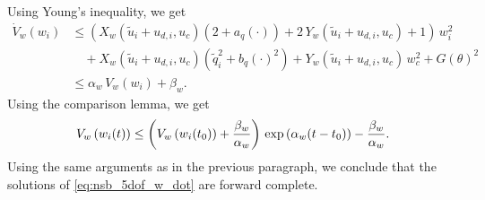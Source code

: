 Using Young's inequality, we get
\begin{equation}
    \begin{split}
        \dot{V}_w(w_i) &\leq \left(X_w\left(\tilde{u}_i + u_{d,i}, u_c\right)\left(2 + a_q(\cdot)\right) + 2\,Y_w\left(\tilde{u}_i + u_{d,i}, u_c\right) + 1\right)\,w_i^2 \\
        & \quad + X_w\left(\tilde{u}_i + u_{d,i}, u_c\right)\left(\tilde{q}_i^2 + b_q(\cdot)^2\right) + Y_w\left(\tilde{u}_i + u_{d,i}, u_c\right)\,w_c^2 + G(\theta)^2 \\
        & \leq \alpha_w\,V_w(w_i) + \beta_w.
    \end{split}
\end{equation}
Using the comparison lemma, we get
\begin{equation}
    V_w\left(w_i(t)\right) \leq \left(V_w\left(w_i(t_0)\right) + \frac{\beta_w}{\alpha_w}\right)\,{\rm exp}\left(\alpha_w(t - t_0)\right) - \frac{\beta_w}{\alpha_w}.
\end{equation}
Using the same arguments as in the previous paragraph, we conclude that the solutions of \eqref{eq:nsb_5dof_w_dot} are forward complete.

